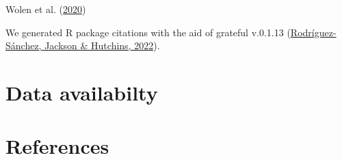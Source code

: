 \documentclass[10pt,a4paper]{article}
\begin{document}
Wolen et al. (\protect\hyperlink{ref-osfr}{2020})

We generated R package citations with the aid of grateful v.0.1.13 (\protect\hyperlink{ref-grateful}{Rodríguez-Sánchez, Jackson \& Hutchins, 2022}).

\hypertarget{data-availabilty}{%
\section{Data availabilty}\label{data-availabilty}}

\hypertarget{references}{%
\section*{References}\label{references}}
\end{document}

